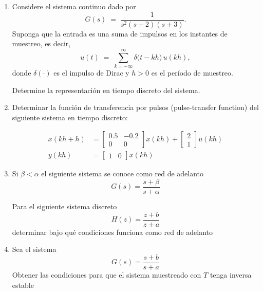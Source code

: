 \documentclass[a4paper,12pt]{article}
\begin{document}
\begin{enumerate}
	\item Considere el sistema continuo dado por
	      \[
		      G(s) \;=\; \frac{1}{s^{2}(s+2)(s+3)}.
	      \]
	      Suponga que la entrada es una suma de impulsos en los instantes de muestreo, es decir,
	      \[
		      u(t) \;=\; \sum_{k=-\infty}^{\infty} \delta\!\big(t-kh\big)\,u(kh),
	      \]
	      donde $\delta(\cdot)$ es el impulso de Dirac y $h>0$ es el período de muestreo.

	      Determine la representación en tiempo discreto del sistema.


	\item Determinar la función de transferencia por pulsos (pulse-transfer function) del siguiente sistema en tiempo discreto:

	      \begin{align*}
		      x(kh+h) & = \begin{bmatrix} 0.5 & -0.2\\0 & 0\end{bmatrix}x(kh)+\begin{bmatrix}2 \\ 1 \end{bmatrix}u(kh) \\
		      y(kh)   & =\begin{bmatrix}1 & 0\end{bmatrix}x(kh)
	      \end{align*}

	\item Si $\beta<\alpha$ el siguiente sistema se conoce como red de adelanto
	      \[ G(s)=\frac{s+\beta}{s+\alpha}\]

	      Para el siguiente sistema discreto
	      \[ H(z)=\frac{z+b}{z+a}\]
	      determinar bajo qué condiciones funciona como red de adelanto


	\item Sea el sistema
	      \[ G(s)=\frac{s+b}{s+a}\]
	      Obtener las condiciones para que el sistema muestreado con $T$ tenga inversa estable

\end{enumerate}
\end{document}
